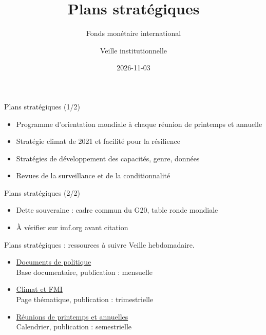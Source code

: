 \documentclass[aspectratio=169,11pt]{beamer}
\title{Plans stratégiques}
\subtitle{Fonds monétaire international}
\author{Veille institutionnelle}
\date{2026-11-03}
\begin{document}
\begin{frame}\titlepage\end{frame}

\begin{frame}{Plans stratégiques (1/2)}
\begin{itemize}
\item Programme d'orientation mondiale à chaque réunion de printemps et annuelle
\item Stratégie climat de 2021 et facilité pour la résilience
\item Stratégies de développement des capacités, genre, données
\item Revues de la surveillance et de la conditionnalité
\end{itemize}
\end{frame}

\begin{frame}{Plans stratégiques (2/2)}
\begin{itemize}
\item Dette souveraine : cadre commun du G20, table ronde mondiale
\item À vérifier sur imf.org avant citation
\end{itemize}
\end{frame}

\begin{frame}{Plans stratégiques : ressources à suivre}
\small
Veille hebdomadaire.
\begin{itemize}
\item \href{https://www.imf.org/en/Publications/Policy-Papers}{Documents de politique}\\{\footnotesize Base documentaire, publication : mensuelle}
\item \href{https://www.imf.org/en/Topics/climate-change}{Climat et FMI}\\{\footnotesize Page thématique, publication : trimestrielle}
\item \href{https://www.imf.org/en/Meetings}{Réunions de printemps et annuelles}\\{\footnotesize Calendrier, publication : semestrielle}
\end{itemize}
\end{frame}
\end{document}
